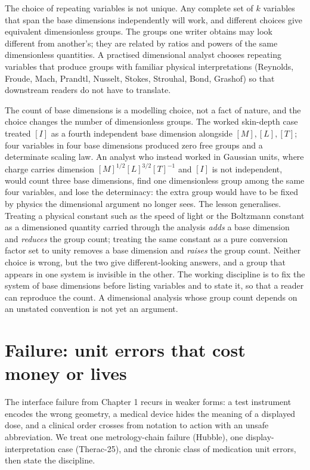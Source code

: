 \begin{mastery}
The choice of repeating variables is not unique. Any complete set of
$k$ variables that span the base dimensions independently will work,
and different choices give equivalent dimensionless groups. The
groups one writer obtains may look different from another's; they are
related by ratios and powers of the same dimensionless quantities. A
practised dimensional analyst chooses repeating variables that
produce groups with familiar physical interpretations (Reynolds,
Froude, Mach, Prandtl, Nusselt, Stokes, Strouhal, Bond, Grashof) so
that downstream readers do not have to translate.
\end{mastery}

\begin{mastery}
The count of base dimensions is a modelling choice, not a fact of
nature, and the choice changes the number of dimensionless groups. The
worked skin-depth case treated $[I]$ as a fourth independent base
dimension alongside $[M], [L], [T]$; four variables in four base
dimensions produced zero free groups and a determinate scaling law.
An analyst who instead worked in Gaussian units, where charge carries
dimension $[M]^{1/2}[L]^{3/2}[T]^{-1}$ and $[I]$ is not independent,
would count three base dimensions, find one dimensionless group among
the same four variables, and lose the determinacy: the extra group
would have to be fixed by physics the dimensional argument no longer
sees. The lesson generalises. Treating a physical constant such as
the speed of light or the Boltzmann constant as a dimensioned quantity
carried through the analysis \emph{adds} a base dimension and
\emph{reduces} the group count; treating the same constant as a pure
conversion factor set to unity removes a base dimension and
\emph{raises} the group count. Neither choice is wrong, but the two
give different-looking answers, and a group that appears in one
system is invisible in the other. The working discipline is to fix the
system of base dimensions before listing variables and to state it, so
that a reader can reproduce the count. A dimensional analysis whose
group count depends on an unstated convention is not yet an argument.
\end{mastery}

\section{Failure: unit errors that cost money or lives}

The interface failure from Chapter 1 recurs in weaker forms: a test
instrument encodes the wrong geometry, a medical device hides the
meaning of a displayed dose, and a clinical order crosses from
notation to action with an unsafe abbreviation. We treat one
metrology-chain failure (Hubble), one display-interpretation case
(Therac-25), and the chronic class of medication unit errors, then
state the discipline.

